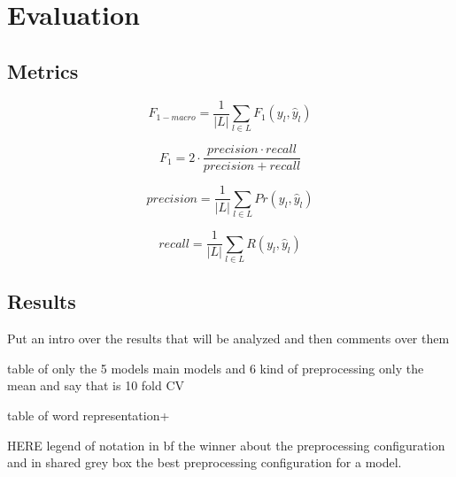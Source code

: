 \section{Evaluation} \label{sec:evaluation}

\subsection{Metrics}

\begin{equation}
F_{1-macro} = \frac{1}{|L|} \displaystyle\sum_{l\in L} F_1(y_l, \hat{y}_l)
\end{equation}

\begin{equation}
F_1 = 2 \cdot \frac{precision \cdot recall }{precision + recall}
\end{equation}

\begin{equation}
precision = \frac{1}{|L|} \displaystyle\sum_{l\in L} Pr(y_l, \hat{y}_l)
\end{equation}

\begin{equation}
recall = \frac{1}{|L|} \displaystyle\sum_{l\in L} R(y_l, \hat{y}_l)
\end{equation}


\subsection{Results}

Put an intro over the results that will be analyzed and then comments over them

table of only the 5 models main models and 6 kind of preprocessing
only the mean and say that is 10 fold CV

table of word representation+


HERE legend of notation
in bf the winner about the preprocessing configuration and in shared grey box the best preprocessing configuration for a model.

